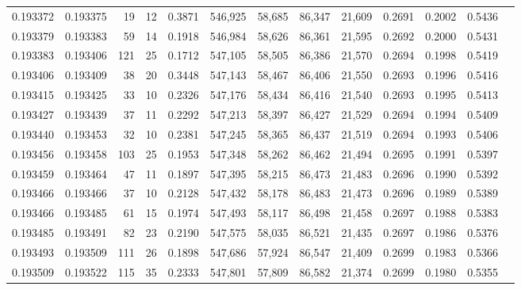 \begin{tabular}{rrrrrrrrrrrrr}
0.193372 & 0.193375 &    19 &  12 &                                     0.3871 & 546,925 &  58,685 &  86,347 &  21,609 & 0.2691 & 0.2002 & 0.5436 \\
0.193379 & 0.193383 &    59 &  14 &                                     0.1918 & 546,984 &  58,626 &  86,361 &  21,595 & 0.2692 & 0.2000 & 0.5431 \\
0.193383 & 0.193406 &   121 &  25 &                                     0.1712 & 547,105 &  58,505 &  86,386 &  21,570 & 0.2694 & 0.1998 & 0.5419 \\
0.193406 & 0.193409 &    38 &  20 &                                     0.3448 & 547,143 &  58,467 &  86,406 &  21,550 & 0.2693 & 0.1996 & 0.5416 \\
0.193415 & 0.193425 &    33 &  10 &                                     0.2326 & 547,176 &  58,434 &  86,416 &  21,540 & 0.2693 & 0.1995 & 0.5413 \\
0.193427 & 0.193439 &    37 &  11 &                                     0.2292 & 547,213 &  58,397 &  86,427 &  21,529 & 0.2694 & 0.1994 & 0.5409 \\
0.193440 & 0.193453 &    32 &  10 &                                     0.2381 & 547,245 &  58,365 &  86,437 &  21,519 & 0.2694 & 0.1993 & 0.5406 \\
0.193456 & 0.193458 &   103 &  25 &                                     0.1953 & 547,348 &  58,262 &  86,462 &  21,494 & 0.2695 & 0.1991 & 0.5397 \\
0.193459 & 0.193464 &    47 &  11 &                                     0.1897 & 547,395 &  58,215 &  86,473 &  21,483 & 0.2696 & 0.1990 & 0.5392 \\
0.193466 & 0.193466 &    37 &  10 &                                     0.2128 & 547,432 &  58,178 &  86,483 &  21,473 & 0.2696 & 0.1989 & 0.5389 \\
0.193466 & 0.193485 &    61 &  15 &                                     0.1974 & 547,493 &  58,117 &  86,498 &  21,458 & 0.2697 & 0.1988 & 0.5383 \\
0.193485 & 0.193491 &    82 &  23 &                                     0.2190 & 547,575 &  58,035 &  86,521 &  21,435 & 0.2697 & 0.1986 & 0.5376 \\
0.193493 & 0.193509 &   111 &  26 &                                     0.1898 & 547,686 &  57,924 &  86,547 &  21,409 & 0.2699 & 0.1983 & 0.5366 \\
0.193509 & 0.193522 &   115 &  35 &                                     0.2333 & 547,801 &  57,809 &  86,582 &  21,374 & 0.2699 & 0.1980 & 0.5355 \\

\end{tabular}
